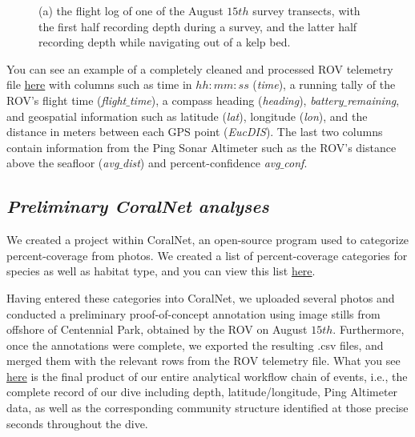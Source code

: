 \documentclass[11pt]{article}
\begin{document}
\begin{figure}[h!]
\centering
{}
\caption{
(a) the flight log of one of the August $15th$ survey transects, with 
the first half recording depth during a survey, and the latter half 
recording depth while navigating out of a kelp bed. 
}
\label{divelog}
\end{figure}

You can see an example of a completely cleaned and processed ROV 
telemetry file 
\href{https://github.com/zhrandell/Seattle_Aquarium_ROV_telemetry_imagery_analysis/blob/main/ROV_telemetry/Cleaned/2022-08-15_09-57-40.csv}{here}
 with columns such as time in $hh:mm:ss$ (\textit{time}), 
a running tally of the ROV's flight time (\textit{flight$\_$time}), 
a compass heading (\textit{heading}), 
\textit{battery$\_$remaining}, and 
geospatial information such as 
latitude (\textit{lat}),
longitude (\textit{lon}),
and the distance in meters between each GPS point (\textit{EucDIS}). 
The last two columns contain information from the Ping Sonar 
Altimeter such as the ROV's distance above the 
seafloor (\textit{avg$\_$dist}) and percent-confidence 
\textit{avg$\_$conf}. 

\subsection{\textit{Preliminary CoralNet analyses}}
We created a project within CoralNet, an open-source program used to 
categorize percent-coverage from photos.
We created a list of percent-coverage categories for species as well as 
habitat type, and you can view this list 
\href{https://github.com/zhrandell/Seattle_Aquarium_ROV_telemetry_imagery_analysis/blob/main/documents/CoralNet_Percent_Cover_Classifications.xlsx}{here}.
 
Having entered these categories into CoralNet, we uploaded several 
photos and conducted a preliminary proof-of-concept annotation using 
image stills from offshore of Centennial Park, obtained by the ROV on 
August $15th$. 
Furthermore, once the annotations were complete, we exported the 
resulting .csv files, and merged them with the relevant rows from the 
ROV telemetry file. 
What you see 
\href{https://github.com/zhrandell/Seattle_Aquarium_ROV_telemetry_imagery_analysis/blob/15b0c253a3292df240f1559ae9e0f73d25d6be66/ROV_telemetry/Cleaned/Telemetry_and_CoralNet.xlsx}{here}
 is the final product of our entire analytical 
workflow chain of events, i.e., the complete record of our dive 
including depth, latitude/longitude, Ping Altimeter data, as well as 
the corresponding community structure identified at those precise 
seconds throughout the dive.  
\end{document}

